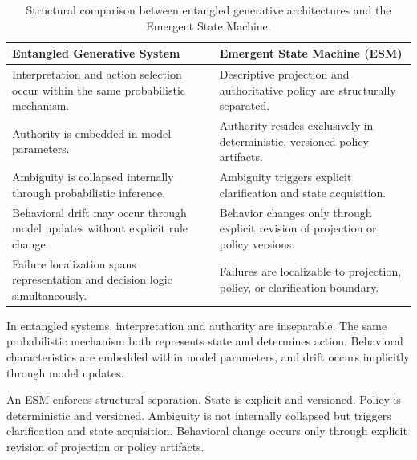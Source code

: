 \documentclass[11pt]{article}
\begin{document}
\begin{table}[H]
\centering
\small
\renewcommand{\arraystretch}{1.3}  %
\setlength{\tabcolsep}{10pt}       %

\begin{tabular}{@{}p{5.6cm}p{5.6cm}@{}}
\toprule
\textbf{Entangled Generative System} & \textbf{Emergent State Machine (ESM)} \\
\midrule

Interpretation and action selection occur within the same probabilistic mechanism. 
&
Descriptive projection and authoritative policy are structurally separated. \\[10pt]

Authority is embedded in model parameters. 
&
Authority resides exclusively in deterministic, versioned policy artifacts. \\[10pt]

Ambiguity is collapsed internally through probabilistic inference. 
&
Ambiguity triggers explicit clarification and state acquisition. \\[10pt]

Behavioral drift may occur through model updates without explicit rule change. 
&
Behavior changes only through explicit revision of projection or policy versions. \\[10pt]

Failure localization spans representation and decision logic simultaneously. 
&
Failures are localizable to projection, policy, or clarification boundary. \\

\bottomrule
\end{tabular}

\caption{Structural comparison between entangled generative architectures and the Emergent State Machine.}
\end{table}

In entangled systems, interpretation and authority are inseparable. The same probabilistic mechanism both represents state and determines action. Behavioral characteristics are embedded within model parameters, and drift occurs implicitly through model updates.

An ESM enforces structural separation. State is explicit and versioned. Policy is deterministic and versioned. Ambiguity is not internally collapsed but triggers clarification and state acquisition. Behavioral change occurs only through explicit revision of projection or policy artifacts.
\end{document}

